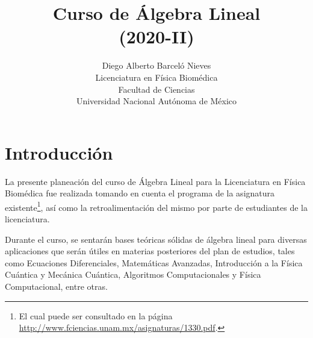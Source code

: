 \documentclass[12pt]{article}
\begin{document}
\title{Curso de Álgebra Lineal \\ (2020-II)}
\author{Diego Alberto Barceló Nieves\\ Licenciatura en Física Biomédica \\ Facultad de Ciencias \\ Universidad Nacional Autónoma de México}
\date{}
\maketitle

\section{Introducción}

La presente planeación del curso de Álgebra Lineal para la Licenciatura en Física Biomédica fue realizada tomando en cuenta el programa de la asignatura existente\footnote{El cual puede ser consultado en la página \url{http://www.fciencias.unam.mx/asignaturas/1330.pdf}.}, así como la retroalimentación del mismo por parte de estudiantes de la licenciatura.


Durante el curso, se sentarán bases teóricas sólidas de álgebra lineal para diversas aplicaciones que serán útiles en materias posteriores del plan de estudios, tales como Ecuaciones Diferenciales, Matemáticas Avanzadas, Introducción a la Física Cuántica y Mecánica Cuántica, Algoritmos Computacionales y Física Computacional, entre otras.
\end{document}
